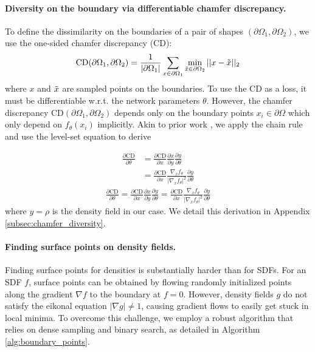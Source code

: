 \paragraph{Diversity on the boundary via differentiable chamfer discrepancy.}
To define the dissimilarity on the boundaries of a pair of shapes $(\partial \Omega_1, \partial \Omega_2)$, we use the one-sided chamfer discrepancy (CD):
\begin{align}
\label{eq:1_sided_chamfer}
    \text{CD}(\partial \Omega_1, \partial \Omega_2) = \frac{1}{\left| \partial \Omega_1 \right|} \sum_{x \in \partial \Omega_1} \min_{\Tilde{x} \in \partial \Omega_2} ||x-\Tilde{x}||_2
\end{align}
where $x$ and $\Tilde{x}$ are sampled points on the boundaries.
To use the CD as a loss, it must be differentiable w.r.t. the network parameters $\theta$.
However, the chamfer discrepancy $\text{CD}(\partial\Omega_1, \partial\Omega_2)$ depends only on the boundary points $x_i \in \partial \Omega$ which only depend on $f_\theta (x_i)$ implicitly.
Akin to prior work \citep{chen_converting_2010, Berzins2023bs, mehta_level_2022}, we apply the chain rule and use the level-set equation to derive

    \begin{align}
        \frac{\partial \text{CD}}{\partial \theta} &= \frac{\partial \text{CD}}{\partial x} \frac{\partial x}{\partial y} \frac{\partial y}{\partial \theta} \nonumber \\ 
        &= \frac{\partial \text{CD}}{\partial x} \frac{\nabla_x f_\theta}{|\nabla_x f_\theta|^2} \frac{\partial y}{\partial \theta} \label{eq:level_set}
    \end{align}
\else
    \begin{align}
    \label{eq:level_set}
        \frac{\partial \text{CD}}{\partial \theta} = \frac{\partial \text{CD}}{\partial x} \frac{\partial x}{\partial y} \frac{\partial y}{\partial \theta} = \frac{\partial \text{CD}}{\partial x} \frac{\nabla_x f_\theta}{|\nabla_x f_\theta|^2} \frac{\partial y}{\partial \theta} 
    \end{align}
\fi
where $y = \rho$ is the density field in our case.
We detail this derivation in Appendix \ref{subsec:chamfer_diversity}.


\paragraph{Finding surface points on density fields.}
Finding surface points for densities is substantially harder than for SDFs.
For an SDF $f$, surface points can be obtained by flowing randomly initialized points along the gradient $\nabla f$ to the boundary at $f=0$. 
However, density fields $g$ do not satisfy the eikonal equation $|\nabla g| \neq 1$, causing gradient flows to easily get stuck in local minima. 
To overcome this challenge, we employ a robust algorithm that relies on dense sampling and binary search, as detailed in Algorithm \ref{alg:boundary_points}.



